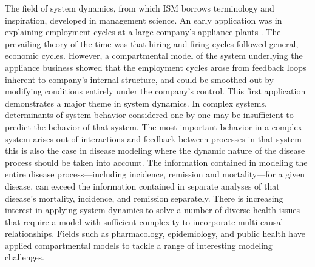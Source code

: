 The field of system dynamics, from which ISM borrows terminology and
inspiration, developed in management science. An early application was
in explaining employment cycles at a large company's appliance plants
\cite{Forrester_Counterintuitive_1971}. The prevailing theory of the
time was that hiring and firing cycles followed general, economic
cycles. However, a compartmental model of the system underlying the
appliance business showed that the employment cycles arose from
feedback loops inherent to company's internal structure, and could be
smoothed out by modifying conditions entirely under the company's
control. This first application demonstrates a major theme in system
dynamics. In complex systems, determinants of system behavior
considered one-by-one may be insufficient to predict the behavior of
that system. The most important behavior in a complex system arises
out of interactions and feedback between processes in that
system---this is also the case in disease modeling where the dynamic
nature of the disease process should be taken into account. The
information contained in modeling the entire disease
process---including incidence, remission and mortality---for a given
disease, can exceed the information contained in separate analyses of
that disease's mortality, incidence, and remission separately. There
is increasing interest in applying system dynamics to solve a number
of diverse health issues that require a model with sufficient
complexity to incorporate multi-causal relationships. Fields such as
pharmacology, epidemiology, and public health have applied
compartmental models to tackle a range of interesting modeling
challenges.


